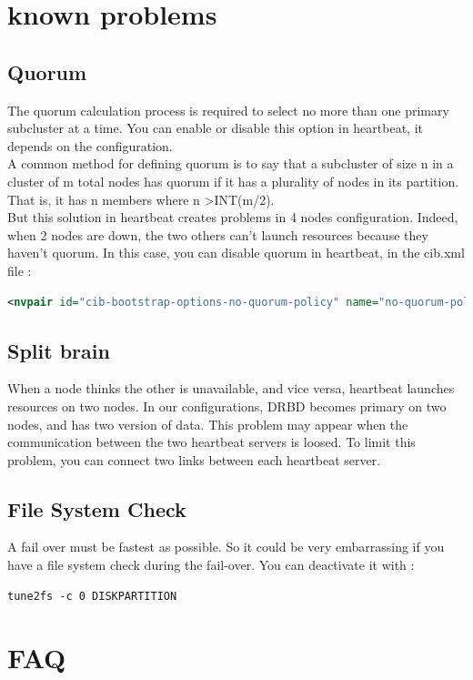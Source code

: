 \documentclass[a4paper,10pt]{report}
\begin{document}
\chapter{known problems}
\section{Quorum}
The quorum calculation process is required to select no more than one primary subcluster at a time. You can enable or disable this option in heartbeat, it depends on the configuration.\\
A common method for defining quorum is to say that a subcluster of size n in a cluster of m total nodes has quorum if it has a plurality of nodes in its partition. That is, it has n members where n \textgreater INT(m/2).\\
But this solution in heartbeat creates problems in 4 nodes configuration. Indeed, when 2 nodes are down, the two others can't launch resources because they haven't quorum. In this case, you
can disable quorum in heartbeat, in the cib.xml file :
\begin{lstlisting}[language=xml]
<nvpair id="cib-bootstrap-options-no-quorum-policy" name="no-quorum-policy" value="ignore"/>
\end{lstlisting}


\section{Split brain}
\label{splitbrain} 
When a node thinks the other is unavailable, and vice versa, heartbeat launches resources on two nodes. In our configurations, DRBD becomes primary on two nodes, and has two version of data. This problem may appear when the communication between the two heartbeat servers is loosed.
To limit this problem, you can connect two links between each heartbeat server.



\section{File System Check}
A fail over must be fastest as possible. So it could be very embarrassing if you have a file system check during the fail-over. You can deactivate it with :
\begin{lstlisting}
tune2fs -c 0 DISKPARTITION
\end{lstlisting}

\chapter{FAQ}
\end{document}
